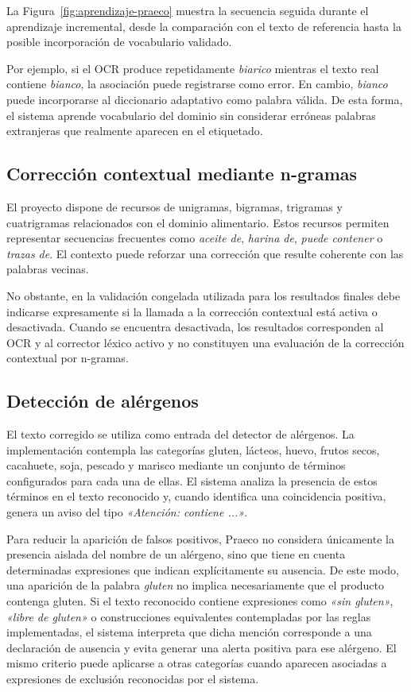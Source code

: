 La Figura~\ref{fig:aprendizaje-praeco} muestra la secuencia seguida durante el aprendizaje incremental, desde la comparación con el texto de referencia hasta la posible incorporación de vocabulario validado.

\medskip

Por ejemplo, si el OCR produce repetidamente \textit{biarico} mientras el texto real contiene \textit{bianco}, la asociación puede registrarse como error. En cambio, \textit{bianco} puede incorporarse al diccionario adaptativo como palabra válida. De esta forma, el sistema aprende vocabulario del dominio sin considerar erróneas palabras extranjeras que realmente aparecen en el etiquetado.

\subsection{Corrección contextual mediante n-gramas}

El proyecto dispone de recursos de unigramas, bigramas, trigramas y cuatrigramas relacionados con el dominio alimentario. Estos recursos permiten representar secuencias frecuentes como \textit{aceite de}, \textit{harina de}, \textit{puede contener} o \textit{trazas de}. El contexto puede reforzar una corrección que resulte coherente con las palabras vecinas.

No obstante, en la validación congelada utilizada para los resultados finales debe indicarse expresamente si la llamada a la corrección contextual está activa o desactivada. Cuando se encuentra desactivada, los resultados corresponden al OCR y al corrector léxico activo y no constituyen una evaluación de la corrección contextual por n-gramas.

\subsection{Detección de alérgenos}

El texto corregido se utiliza como entrada del detector de alérgenos. La implementación contempla las categorías gluten, lácteos, huevo, frutos secos, cacahuete, soja, pescado y marisco mediante un conjunto de términos configurados para cada una de ellas. El sistema analiza la presencia de estos términos en el texto reconocido y, cuando identifica una coincidencia positiva, genera un aviso del tipo \textit{«Atención: contiene ...»}.

Para reducir la aparición de falsos positivos, Praeco no considera únicamente la presencia aislada del nombre de un alérgeno, sino que tiene en cuenta determinadas expresiones que indican explícitamente su ausencia. De este modo, una aparición de la palabra \textit{gluten} no implica necesariamente que el producto contenga gluten. Si el texto reconocido contiene expresiones como \textit{«sin gluten»}, \textit{«libre de gluten»} o construcciones equivalentes contempladas por las reglas implementadas, el sistema interpreta que dicha mención corresponde a una declaración de ausencia y evita generar una alerta positiva para ese alérgeno. El mismo criterio puede aplicarse a otras categorías cuando aparecen asociadas a expresiones de exclusión reconocidas por el sistema.

